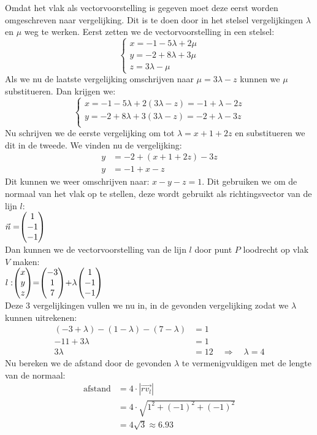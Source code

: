 Omdat het vlak als vectorvoorstelling is gegeven moet deze eerst worden omgeschreven naar vergelijking. Dit is te doen door in het stelsel vergelijkingen $\lambda$ en $\mu$ weg te werken.
Eerst zetten we de vectorvoorstelling in een stelsel:
\[\begin{cases}
x = -1 -5\lambda + 2\mu\\
y = -2 + 8\lambda + 3\mu\\
z = 3\lambda - \mu  
\end{cases}
\] 
Als we nu de laatste vergelijking omschrijven naar $\mu = 3\lambda-z$ kunnen we $\mu$ substitueren. Dan krijgen we:
\[\begin{cases}
x = -1 -5\lambda + 2(3\lambda-z) = -1 + \lambda -2z\\
y = -2 + 8\lambda + 3(3\lambda-z) = -2 + \lambda - 3z\\
\end{cases}
\] 
Nu schrijven we de eerste vergelijking om tot $\lambda = x + 1 + 2z$ en substitueren we dit in de tweede. We vinden nu de vergelijking: 
\begin{align*}
    y &= -2+(x+1+2z) -3z \\
    y &= -1 + x - z
\end{align*}
Dit kunnen we weer omschrijven naar: $x-y-z=1$. Dit gebruiken we om de normaal van het vlak op te stellen, deze wordt gebruikt als richtingsvector van de lijn $l$: \\
    $ \vec{n} = \vecdrie{1}{-1}{-1}  $ \\
Dan kunnen we de vectorvoorstelling van de lijn $l$ door punt $P$ loodrecht op vlak $V$ maken: \\
$l: \vecdrie{x}{y}{z} = \vecdrie{-3}{1}{7} + \lambda \vecdrie{1}{-1}{-1} $ \\
Deze 3 vergelijkingen vullen we nu in, in de gevonden vergelijking zodat we $\lambda$ kunnen uitrekenen:
\begin{align*}
    (-3 + \lambda) - (1-\lambda) - (7-\lambda) &= 1 \\
    -11 + 3\lambda &= 1 \\
    3\lambda &= 12 \quad \Rightarrow \quad \lambda = 4
\end{align*}
Nu bereken we de afstand door de gevonden $\lambda$ te vermenigvuldigen met de lengte van de normaal: 
\begin{align*}
    \text{afstand} &= 4\cdot |\overrightarrow{rv_{l}}| \\
    &= 4\cdot \sqrt{1^{2} + (-1)^{2} + (-1)^{2} } \\
    &= 4\sqrt{3} \approx 6.93
\end{align*}

